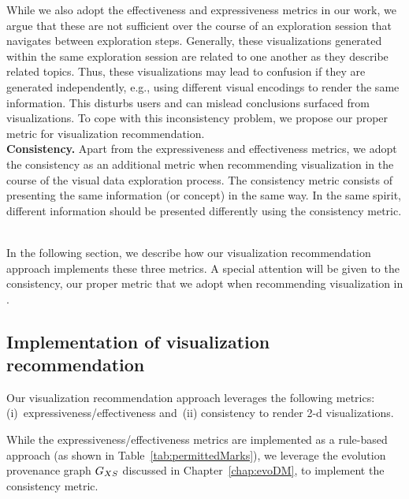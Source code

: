 While we also adopt the effectiveness and expressiveness metrics in our work, we argue that these are not sufficient over the course of an exploration session that navigates between exploration steps.
Generally, these visualizations generated within the same exploration session are related to one another as they describe related topics. Thus, these visualizations may lead to confusion if they are generated independently, e.g., using different visual encodings to render the same information. This disturbs users and can mislead conclusions surfaced from visualizations. 
To cope with this inconsistency problem, we propose our proper metric for visualization recommendation.
~~\\
\noindent \textbf{Consistency.} 
Apart from the expressiveness and effectiveness metrics, we adopt the consistency as an additional metric when recommending visualization in the course of the visual data exploration process.
The consistency metric consists of presenting the same information (or concept) in the same way. 
In the same spirit, different information should be presented differently using the consistency metric. 



 
 ~~\\
In the following section, we describe how our visualization recommendation approach implements these three metrics. A special attention will be given to the consistency, our proper metric that we adopt when recommending visualization in \prototype{}.

\subsection{Implementation of visualization recommendation}
\label{vis:implemntation}
Our visualization recommendation approach leverages the following metrics: (i)~expressiveness/effectiveness and~(ii) consistency to render 2-d visualizations.

While the expressiveness/effectiveness metrics are implemented as a rule-based approach (as shown in Table~\ref{tab:permittedMarks}), we leverage the evolution provenance graph $G_{XS}$ discussed in Chapter~\ref{chap:evoDM}, to implement the consistency metric.

